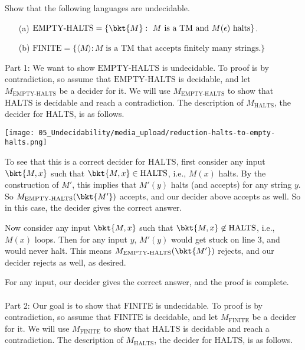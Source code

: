 \begin{flex}
\label{grp:exercise:Practice-with-undecidability-proofs}

\begin{exercise}
\label{exercise:Practice-with-undecidability-proofs}
Show that the following languages are undecidable.
\begin{enumerate}
    \item[(a)] $\text{EMPTY-HALTS} = \{\bkt{M} : \text{ $M$ is a TM and $M(\epsilon)$ halts}\}$.
    \item[(b)] $\text{FINITE} = \{\langle M \rangle : \text{$M$ is a TM that accepts finitely many strings.}\}$
\end{enumerate}

\end{exercise}

\begin{solution}
\label{sol:Undecidable-Languages::part}
Part 1: We want to show $\text{EMPTY-HALTS}$ is undecidable. To proof is by contradiction, so assume that $\text{EMPTY-HALTS}$ is decidable, and let $M_{\text{EMPTY-HALTS}}$ be a decider for it. We will use $M_{\text{EMPTY-HALTS}}$ to show that $\text{HALTS}$ is decidable and reach a contradiction. The description of $M_{\text{HALTS}}$, the decider for $\text{HALTS}$, is as follows.

\begin{center}
\texttt{[image: 05\_Undecidability/media\_upload/reduction-halts-to-empty-halts.png]}
\end{center}

To see that this is a correct decider for $\text{HALTS}$, first consider any input $\bkt{M,x}$ such that $\bkt{M,x} \in \text{HALTS}$, i.e., $M(x)$ halts. By the construction of $M'$, this implies that $M'(y)$ halts (and accepts) for any string $y$. So $M_\text{EMPTY-HALTS}(\bkt{M'})$ accepts, and our decider above accepts as well. So in this case, the decider gives the correct answer.

Now consider any input $\bkt{M,x}$ such that $\bkt{M,x} \not\in \text{HALTS}$, i.e., $M(x)$ loops. Then for any input $y$, $M'(y)$ would get stuck on line 3, and would never halt. This means $M_\text{EMPTY-HALTS}(\bkt{M'})$ rejects, and our decider rejects as well, as desired.

For any input, our decider gives the correct answer, and the proof is complete.
\\\\
\noindent
Part 2: Our goal is to show that $\text{FINITE}$ is undecidable. To proof is by contradiction, so assume that $\text{FINITE}$ is decidable, and let $M_\text{FINITE}$ be a decider for it. We will use $M_\text{FINITE}$ to show that $\text{HALTS}$ is decidable and reach a contradiction. The description of $M_{\text{HALTS}}$, the decider for $\text{HALTS}$, is as follows.


\end{solution}
\end{flex}
